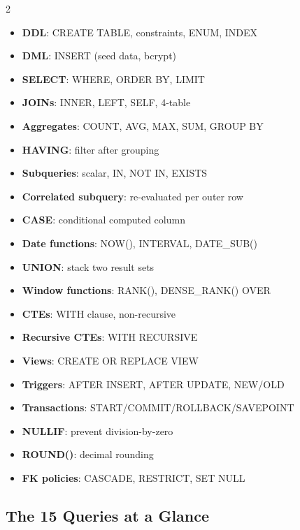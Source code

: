 \documentclass[11pt,a4paper]{article}
\begin{document}
\begin{multicols}{2}
\begin{itemize}[nosep, leftmargin=1.5em, itemsep=1pt]
  \item \textbf{DDL}: CREATE TABLE, constraints, ENUM, INDEX
  \item \textbf{DML}: INSERT (seed data, bcrypt)
  \item \textbf{SELECT}: WHERE, ORDER BY, LIMIT
  \item \textbf{JOINs}: INNER, LEFT, SELF, 4-table
  \item \textbf{Aggregates}: COUNT, AVG, MAX, SUM, GROUP BY
  \item \textbf{HAVING}: filter after grouping
  \item \textbf{Subqueries}: scalar, IN, NOT IN, EXISTS
  \item \textbf{Correlated subquery}: re-evaluated per outer row
  \item \textbf{CASE}: conditional computed column
  \item \textbf{Date functions}: NOW(), INTERVAL, DATE\_SUB()
  \item \textbf{UNION}: stack two result sets
  \item \textbf{Window functions}: RANK(), DENSE\_RANK() OVER
  \item \textbf{CTEs}: WITH clause, non-recursive
  \item \textbf{Recursive CTEs}: WITH RECURSIVE
  \item \textbf{Views}: CREATE OR REPLACE VIEW
  \item \textbf{Triggers}: AFTER INSERT, AFTER UPDATE, NEW/OLD
  \item \textbf{Transactions}: START/COMMIT/ROLLBACK/SAVEPOINT
  \item \textbf{NULLIF}: prevent division-by-zero
  \item \textbf{ROUND()}: decimal rounding
  \item \textbf{FK policies}: CASCADE, RESTRICT, SET NULL
\end{itemize}
\end{multicols}

\subsection{The 15 Queries at a Glance}
\end{document}
